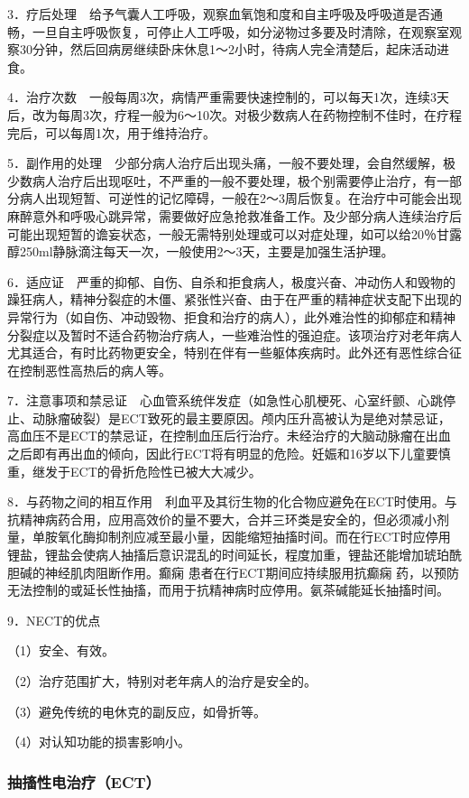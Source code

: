 3．疗后处理　给予气囊人工呼吸，观察血氧饱和度和自主呼吸及呼吸道是否通畅，一旦自主呼吸恢复，可停止人工呼吸，如分泌物过多要及时清除，在观察室观察30分钟，然后回病房继续卧床休息1～2小时，待病人完全清楚后，起床活动进食。

4．治疗次数　一般每周3次，病情严重需要快速控制的，可以每天1次，连续3天后，改为每周3次，疗程一般为6～10次。对极少数病人在药物控制不佳时，在疗程完后，可以每周1次，用于维持治疗。

5．副作用的处理　少部分病人治疗后出现头痛，一般不要处理，会自然缓解，极少数病人治疗后出现呕吐，不严重的一般不要处理，极个别需要停止治疗，有一部分病人出现短暂、可逆性的记忆障碍，一般在2～3周后恢复。在治疗中可能会出现麻醉意外和呼吸心跳异常，需要做好应急抢救准备工作。及少部分病人连续治疗后可能出现短暂的谵妄状态，一般无需特别处理或可以对症处理，如可以给20％甘露醇250ml静脉滴注每天一次，一般使用2～3天，主要是加强生活护理。

6．适应证　严重的抑郁、自伤、自杀和拒食病人，极度兴奋、冲动伤人和毁物的躁狂病人，精神分裂症的木僵、紧张性兴奋、由于在严重的精神症状支配下出现的异常行为（如自伤、冲动毁物、拒食和治疗的病人），此外难治性的抑郁症和精神分裂症以及暂时不适合药物治疗病人，一些难治性的强迫症。该项治疗对老年病人尤其适合，有时比药物更安全，特别在伴有一些躯体疾病时。此外还有恶性综合征在控制恶性高热后的病人等。

7．注意事项和禁忌证　心血管系统伴发症（如急性心肌梗死、心室纤颤、心跳停止、动脉瘤破裂）是ECT致死的最主要原因。颅内压升高被认为是绝对禁忌证，高血压不是ECT的禁忌证，在控制血压后行治疗。未经治疗的大脑动脉瘤在出血之后即有再出血的倾向，因此行ECT将有明显的危险。妊娠和16岁以下儿童要慎重，继发于ECT的骨折危险性已被大大减少。

8．与药物之间的相互作用　利血平及其衍生物的化合物应避免在ECT时使用。与抗精神病药合用，应用高效价的量不要大，合并三环类是安全的，但必须减小剂量，单胺氧化酶抑制剂应减至最小量，因能缩短抽搐时间。而在行ECT时应停用锂盐，锂盐会使病人抽搐后意识混乱的时间延长，程度加重，锂盐还能增加琥珀酰胆碱的神经肌肉阻断作用。癫痫
患者在行ECT期间应持续服用抗癫痫
药，以预防无法控制的或延长性抽搐，而用于抗精神病时应停用。氨茶碱能延长抽搐时间。

9．NECT的优点

（1）安全、有效。

（2）治疗范围扩大，特别对老年病人的治疗是安全的。

（3）避免传统的电休克的副反应，如骨折等。

（4）对认知功能的损害影响小。

\subsubsection{抽搐性电治疗（ECT）}

